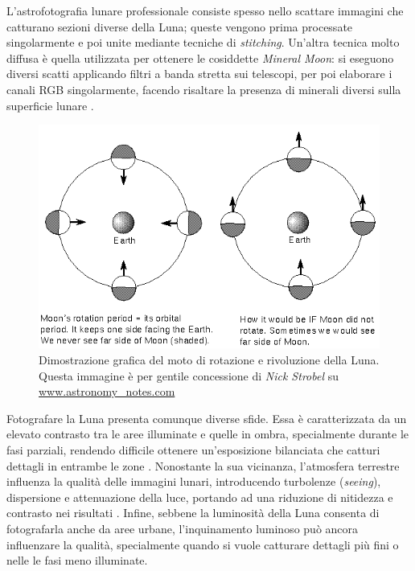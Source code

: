 L'astrofotografia lunare professionale consiste spesso nello scattare immagini che catturano sezioni diverse della Luna; queste vengono prima processate singolarmente e poi unite mediante tecniche di \textit{stitching}. Un'altra tecnica molto diffusa è quella utilizzata per ottenere le cosiddette \textit{Mineral Moon}: si eseguono diversi scatti applicando filtri a banda stretta sui telescopi, per poi elaborare i canali RGB singolarmente, facendo risaltare la presenza di minerali diversi sulla superficie lunare \cite{legault_astrophoto}.

\begin{figure}
    \centering
    \includegraphics[scale = 0.4]{../assets/moonrota.png}
    \captionsetup{justification=centering}
    \caption{Dimostrazione grafica del moto di rotazione e rivoluzione della Luna. Questa immagine è per gentile concessione di \textit{Nick Strobel} su \href{www.astronomy\_notes.com}{www.astronomy\_notes.com}} \label{fig:moonrota}
\end{figure}

Fotografare la Luna presenta comunque diverse sfide. Essa è caratterizzata da un elevato contrasto tra le aree illuminate e quelle in ombra, specialmente durante le fasi parziali, rendendo difficile ottenere un'esposizione bilanciata che catturi dettagli in entrambe le zone \cite{sheehan_epic_moon}. Nonostante la sua vicinanza, l'atmosfera terrestre influenza la qualità delle immagini lunari, introducendo turbolenze (\textit{seeing}), dispersione e attenuazione della luce, portando ad una riduzione di nitidezza e contrasto nei risultati \cite{sheehan_epic_moon}. Infine, sebbene la luminosità della Luna consenta di fotografarla anche da aree urbane, l'inquinamento luminoso può ancora influenzare la qualità, specialmente quando si vuole catturare dettagli più fini o nelle le fasi meno illuminate.

